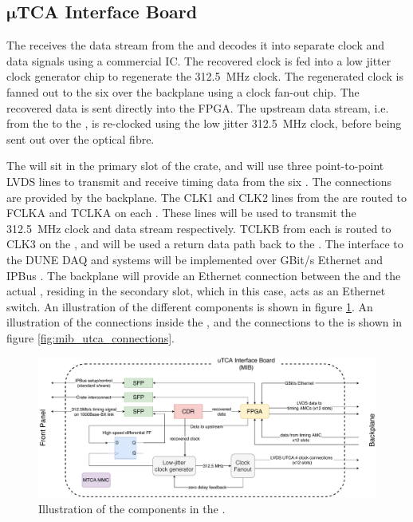 \documentclass{dune}
\begin{document}
\subsection[$\mu$TCA Interface Board]{$\boldsymbol{\mu}$TCA Interface Board}
The  receives the  data stream from the  and decodes it into separate clock and data signals using a commercial  IC. The recovered clock is fed into a low jitter clock generator chip to regenerate the \SI{312.5}{\MHz} clock. The regenerated clock is fanned out to the six  over the  backplane using a clock fan-out chip. The recovered data is sent directly into the  FPGA. The upstream data stream, i.e. from the  to the , is re-clocked using the low jitter \SI{312.5}{\MHz} clock, before being sent out over the optical fibre.

The  will sit in the primary  slot of the  crate, and will use three point-to-point LVDS lines to transmit and receive timing data from the six . The connections are provided by the  backplane. The CLK1 and CLK2 lines from the  are routed to FCLKA and TCLKA on each . These lines will be used to transmit the \SI{312.5}{\MHz} clock and  data stream respectively. TCLKB from each  is routed to CLK3 on the , and will be used a return data path back to the . The interface to the DUNE DAQ and  systems will be implemented over GBit/s Ethernet and IPBus \cite{ipbus}. The  backplane will provide an Ethernet connection between the  and the actual , residing in the secondary  slot, which in this case, acts as an Ethernet switch. An illustration of the different  components is shown in figure \ref{fig:mib_layout}. An illustration of the connections inside the , and the connections to the  is shown in figure \ref{fig:mib_utca_connections}.

\begin{figure}[h]
\includegraphics[width=\textwidth]{mib_block_diagram.pdf}
\caption{Illustration of the components in the .}
\label{fig:mib_layout}
\end{figure}
\end{document}
